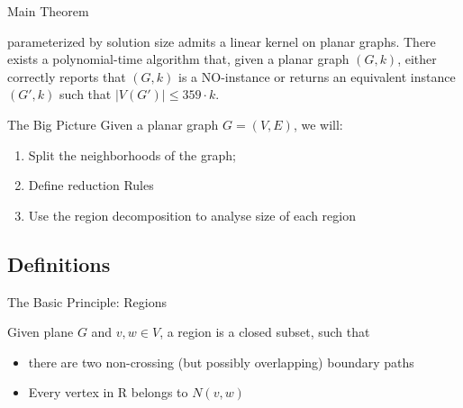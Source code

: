 \begin{frame}[c]{Main Theorem}
\begin{tcolorbox}[colback=TUMBlueLighter,title=The Main Theorem]
    \sdom parameterized by solution size admits a linear kernel on planar graphs.
    There exists a polynomial-time algorithm that, given a planar graph $(G, k)$, either correctly reports that $(G, k)$ is a NO-instance or returns an equivalent instance $(G', k)$ such that $|V(G')| \leq 359 \cdot k$.
\end{tcolorbox}
\end{frame}

\begin{frame}[c]{The Big Picture}
    Given a planar graph $G = (V ,E)$, we will:

    \begin{enumerate}
     \pause   \item Split the neighborhoods of the graph;
     \pause   \item Define reduction Rules
     \pause   \item Use the region decomposition to analyse size of each region
    \end{enumerate}
\end{frame}

\subsection{Definitions}
\begin{frame}[c]{The Basic Principle: Regions}

    \begin{tcolorbox}[colback=TUMBlueLighter,title=Region (Simplified)]
        Given plane $G$ and $v,w \in V$, a region is a closed subset, such that
        \begin{itemize}
            \item there are two non-crossing (but possibly overlapping) boundary paths
            \item Every vertex in R belongs to $N(v,w)$
        \end{itemize}
    \end{tcolorbox}
    \pause \begin{figure}[!ht]
        \end{figure}
\end{frame}

